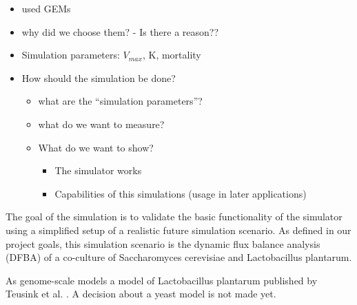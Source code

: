 \documentclass[a4paper,10pt]{article}
\begin{document}
\begin{itemize}
 \item used GEMs
 \item why did we choose them? - Is there a reason??
 \item Simulation parameters: $V_{max}$, K, mortality
 \item How should the simulation be done?
 \begin{itemize}
  \item what are the ``simulation parameters''?
  \item what do we want to measure?
  \item What do we want to show?
  \begin{itemize}
   \item The simulator works
   \item Capabilities of this simulations (usage in later applications)
  \end{itemize}
 \end{itemize}
\end{itemize}

The goal of the simulation is to validate the basic functionality of the simulator using a simplified setup of a realistic future
simulation scenario. As defined in our project goals, this simulation scenario is the dynamic flux balance analysis (DFBA) of a
co-culture of Saccharomyces cerevisiae and Lactobacillus plantarum.

As genome-scale models a model of Lactobacillus plantarum published by Teusink et al. \cite{teusink_analysis_2006}. A decision about
a yeast model is not made yet.
\end{document}
